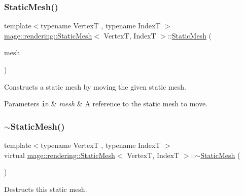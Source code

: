\subsubsection{\texorpdfstring{Static\+Mesh()}{StaticMesh()}\hspace{0.1cm}{\footnotesize\ttfamily [3/3]}}
{\footnotesize\ttfamily template$<$typename VertexT , typename IndexT $>$ \\
\hyperlink{classmage_1_1rendering_1_1_static_mesh}{mage\+::rendering\+::\+Static\+Mesh}$<$ VertexT, IndexT $>$\+::\hyperlink{classmage_1_1rendering_1_1_static_mesh}{Static\+Mesh} (\begin{DoxyParamCaption}\item[{\hyperlink{classmage_1_1rendering_1_1_static_mesh}{Static\+Mesh}$<$ VertexT, IndexT $>$ \&\&}]{mesh }\end{DoxyParamCaption})\hspace{0.3cm}{\ttfamily [noexcept]}}

Constructs a static mesh by moving the given static mesh.


\begin{DoxyParams}[1]{Parameters}
\mbox{\tt in}  & {\em mesh} & A reference to the static mesh to move. \\
\hline
\end{DoxyParams}
\hypertarget{classmage_1_1rendering_1_1_static_mesh_a44fd6319f4a56ff20bc81fb9968dac05}{}\label{classmage_1_1rendering_1_1_static_mesh_a44fd6319f4a56ff20bc81fb9968dac05} 
\subsubsection{\texorpdfstring{$\sim$\+Static\+Mesh()}{~StaticMesh()}}
{\footnotesize\ttfamily template$<$typename VertexT , typename IndexT $>$ \\
virtual \hyperlink{classmage_1_1rendering_1_1_static_mesh}{mage\+::rendering\+::\+Static\+Mesh}$<$ VertexT, IndexT $>$\+::$\sim$\hyperlink{classmage_1_1rendering_1_1_static_mesh}{Static\+Mesh} (\begin{DoxyParamCaption}{ }\end{DoxyParamCaption})\hspace{0.3cm}{\ttfamily [virtual]}}

Destructs this static mesh. 

